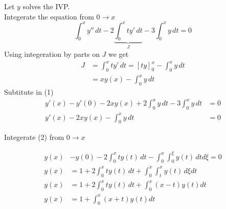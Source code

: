 \documentclass[]{article}
\begin{document}
\begin{adjustwidth}{1cm}{2cm}
Let $y$ solves the IVP.\\
Integerate the equation from $0 \to x$
\begin{equation}
    \int_{0}^{x} y'' \, dt -2\underbrace{\int_{0}^{x} t y' \,dt}_J -3\int_{0}^{x}y \,dt=0    
\end{equation}
Using integeration by parts on $J$ we get 
\begin{align*}
    J &= \int_{0}^{x} t y' \,dt = \left[t y\right]_{0}^{x} - \int_{0}^{x}y \,dt\\
    &= xy(x) - \int_{0}^{x}y \,dt
\end{align*}
Subtitute in (1) 
\begin{align*}
    y'(x) - y'(0) -2xy(x) + 2\int_{0}^{x}y \,dt -3\int_{0}^{x}y \,dt&=0          
    \\
    y'(x) -2xy(x) -\int_{0}^{x}y \,dt&=0 \tag{2}        
\end{align*}

Integerate (2) from $0 \to x$
\\
    \begin{minipage}{0.7\textwidth}
        \begin{align*}
            y(x)&-y(0) -2\int_{0}^{x}ty(t)\,dt -\int_{0}^{x}\int_{0}^{\xi}y(t) \, dtd\xi=0
            \\        
            y(x)&= 1 +2\int_{0}^{x}ty(t)\,dt +\int_{0}^{x}\int_{t}^{x}y(t) \, d\xi dt
            \\
            y(x)&= 1 +2\int_{0}^{x}ty(t)\,dt +\int_{0}^{x}(x-t)y(t)dt
            \\
            y(x)&= 1 +\int_{0}^{x}(x+t)y(t)dt
        \end{align*}
    \end{minipage}%
    \begin{minipage}{0.3\textwidth}
    \end{minipage}
\end{adjustwidth}
\end{document}
